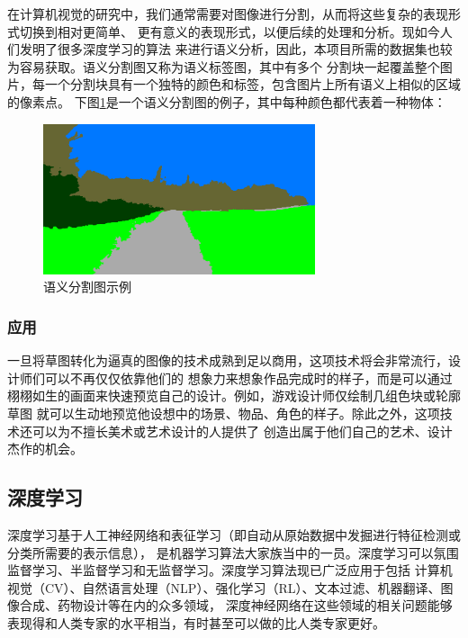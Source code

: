 \documentclass[supercite]{HustGraduPaper}
\theoremstyle{definition}
\begin{document}
在计算机视觉的研究中，我们通常需要对图像进行分割，从而将这些复杂的表现形式切换到相对更简单、
更有意义的表现形式，以便后续的处理和分析\cite{wikipedia}。现如今人们发明了很多深度学习的算法
来进行语义分析，因此，本项目所需的数据集也较为容易获取。语义分割图又称为语义标签图，其中有多个
分割块一起覆盖整个图片，每一个分割块具有一个独特的颜色和标签，包含图片上所有语义上相似的区域的像素点。
下图\ref{fig:segmentation-map-example}是一个语义分割图的例子，其中每种颜色都代表着一种物体：
\begin{figure}[H]
  \begin{center}
  \includegraphics[width=8cm]{images/seg-map-eg}
  \end{center}
  \caption{语义分割图示例}
  \label{fig:segmentation-map-example}
\end{figure}

\subsubsection{应用}

一旦将草图转化为逼真的图像的技术成熟到足以商用，这项技术将会非常流行，设计师们可以不再仅仅依靠他们的
想象力来想象作品完成时的样子，而是可以通过栩栩如生的画面来快速预览自己的设计。例如，游戏设计师仅绘制几组色块或轮廓草图
就可以生动地预览他设想中的场景、物品、角色的样子。除此之外，这项技术还可以为不擅长美术或艺术设计的人提供了
创造出属于他们自己的艺术、设计杰作的机会。

\subsection{深度学习}

深度学习基于人工神经网络和表征学习（即自动从原始数据中发掘进行特征检测或分类所需要的表示信息\cite{wikipedia}），
是机器学习算法大家族当中的一员。深度学习可以氛围监督学习、半监督学习和无监督学习。深度学习算法现已广泛应用于包括
计算机视觉（CV）、自然语言处理（NLP）、强化学习（RL）、文本过滤、机器翻译、图像合成、药物设计等在内的众多领域，
深度神经网络在这些领域的相关问题能够表现得和人类专家的水平相当，有时甚至可以做的比人类专家更好。
\end{document}
